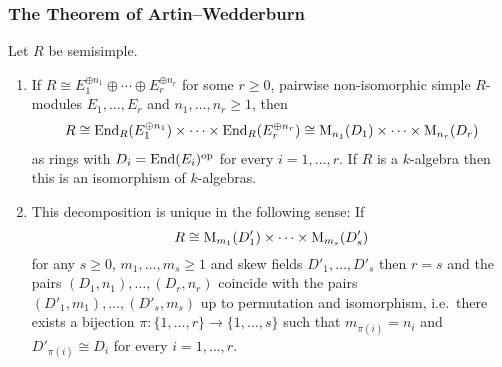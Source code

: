 \subsubsection{The Theorem of Artin--Wedderburn}


\begin{theorem}
  \label{theorem: artin wedderburn theorem}
  Let $R$ be semisimple.
  \begin{enumerate}
    \item
      If $R \cong E_1^{\oplus n_1} \oplus \dotsb \oplus E_r^{\oplus n_r}$ for some $r \geq 0$, pairwise non-isomorphic simple $R$-modules $E_1, \dotsc, E_r$ and $n_1, \dotsc, n_r \geq 1$, then
      \begin{align*}
              R
        \cong \operatorname{End}_R(E_1^{\oplus n_1}) \times \dotsb \times \operatorname{End}_R(E_r^{\oplus n_r})
        \cong \operatorname{M}_{n_1}(D_1) \times \dotsb \times  \operatorname{M}_{n_r}(D_r)
      \end{align*}
      as rings with $D_i = \operatorname{End}(E_i)^{\operatorname{op}}$ for every $i = 1, \dotsc, r$.
      If $R$ is a $k$-algebra then this is an isomorphism of $k$-algebras.
    \item
      This decomposition is unique in the following sense:
      If
      \[
              R
        \cong \operatorname{M}_{m_1}(D'_1) \times \dotsb \times \operatorname{M}_{m_s}(D'_s)
      \]
      for any $s \geq 0$, $m_1, \dotsc, m_s \geq 1$ and skew fields $D'_1, \dotsc, D'_s$ then $r = s$ and the pairs $(D_1, n_1), \dotsc, (D_r, n_r)$ coincide with the pairs $(D'_1, m_1), \dotsc, (D'_s, m_s)$ up to permutation and isomorphism, i.e.\ there exists a bijection $\pi \colon \{1, \dotsc, r\} \to \{1, \dotsc, s\}$ such that $m_{\pi(i)} = n_i$ and $D'_{\pi(i)} \cong D_i$ for every $i = 1, \dotsc, r$.
  \end{enumerate}
\end{theorem}


